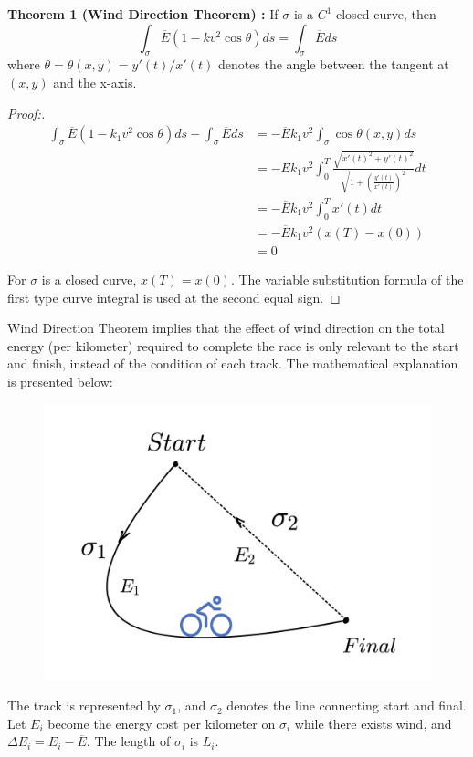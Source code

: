 {\bf Theorem 1 (Wind Direction Theorem) :} If $\sigma$ is a $C^1$ closed curve, then
\begin{equation}\label{WDT}
	\int_{\sigma} \overline{E}(1-kv^2\cos\theta)ds = \int_{\sigma} \overline{E} ds
\end{equation}
 where $\theta=\theta(x,y)=y'(t)/x'(t)$ denotes the angle between the tangent at $(x,y)$ and the x-axis. 
\begin{proof}[Proof:]

\begin{equation}
	\begin{aligned}
	\int_{\sigma} \overline{E}(1-k_1v^2\cos\theta)ds - \int_{\sigma} \overline{E} ds
	&= -\overline{E}k_1v^2 \int_{\sigma} \cos\theta(x,y) ds\\
	&= -\overline{E}k_1v^2 \int_0^T \frac{\sqrt{x'(t)^2+y'(t)^2}}{\sqrt{1+(\frac{y'(t)}{x'(t)})^2}} dt\\
	&= -\overline{E}k_1v^2 \int_0^T x'(t) dt\\
	&= -\overline{E}k_1v^2 (x(T)-x(0))\\
	&= 0
\end{aligned}
\end{equation}
\par For $\sigma$ is a closed curve, $x(T)=x(0)$. The variable substitution formula of the first type curve integral is used at the second equal sign.
\end{proof}
\par Wind Direction Theorem implies that the effect of wind direction on the total energy (per kilometer) required to complete the race is only relevant to the start and finish, instead of the condition of each track. The mathematical explanation is presented below:
\begin{figure} %
	\includegraphics[width=0.9\linewidth]{image/fig1}
	\label{fig1}
\end{figure}
  \par The track is represented by $\sigma_1$, and $\sigma_2$ denotes the line connecting start and final. Let $E_i$ become the energy cost per kilometer on $\sigma_i$ while there exists wind, and $\Delta E_i=E_i-\overline{E}$. The length of $\sigma_i$ is $L_i$.

